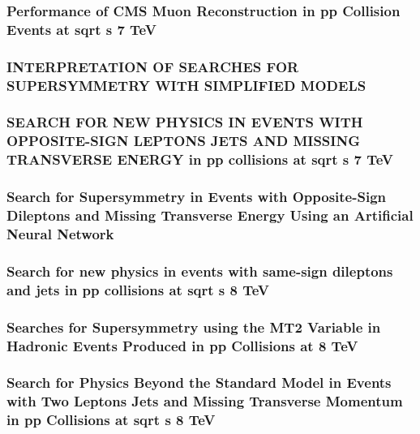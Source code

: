 \documentclass[a4paper, 11pt, twoside, openright]{report}
\begin{document}
\subsubsection{Performance of CMS Muon Reconstruction in pp Collision Events at sqrt s 7 TeV}

\subsubsection{INTERPRETATION OF SEARCHES FOR SUPERSYMMETRY WITH SIMPLIFIED MODELS}

\subsubsection{SEARCH FOR NEW PHYSICS IN EVENTS WITH OPPOSITE-SIGN LEPTONS JETS AND MISSING TRANSVERSE ENERGY in pp collisions at sqrt s 7 TeV}

\subsubsection{Search for Supersymmetry in Events with Opposite-Sign Dileptons and Missing Transverse Energy Using an Artificial Neural Network}

\subsubsection{Search for new physics in events with same-sign dileptons and jets in pp collisions at sqrt s 8 TeV}

\subsubsection{Searches for Supersymmetry using the MT2 Variable in Hadronic Events Produced in pp Collisions at 8 TeV}

\subsubsection{Search for Physics Beyond the Standard Model in Events with Two Leptons Jets and Missing Transverse Momentum in pp Collisions at sqrt s 8 TeV}

\end{document}
